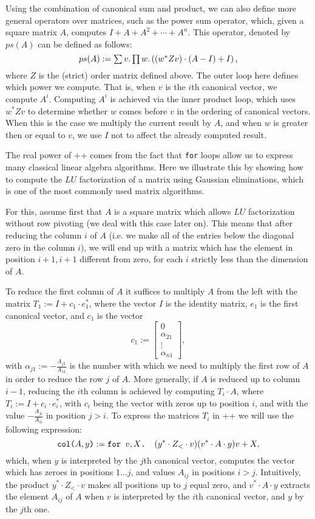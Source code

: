 Using the combination of canonical sum and product, we can also define more general operators over matrices, such as the power sum operator, which, given a square matrix $A$, computes $I + A + A^2 + \cdots + A^n$. This operator, denoted by $ps(A)$ can be defined as follows:
$$ps(A) := \textstyle\sum v.\textstyle\prod w. \left( (w^*Zv)\cdot (A-I) + I\right),$$
where $Z$ is the (strict) order matrix defined above. The outer loop here defines which power we compute. That is, when $v$ is the $i$th canonical vector, we compute $A^i$. Computing $A^i$ is achieved via the inner product loop, which uses $w^*Zv$ to determine whether $w$ comes before $v$ in the ordering of canonical vectors. When this is the case we multiply the current result by $A$, and when $w$ is greater then or equal to $v$, we use $I$ not to affect the already computed result.

\medskip

 The real power of \lang++ comes from the fact that \texttt{for} loops allow us to express many classical linear algebra algorithms. Here we illustrate this by showing how to compute the $LU$ factorization of a matrix using Gaussian eliminations, which is one of the most commonly used matrix algorithms.

For this, assume first that $A$ is a square matrix which allows $LU$ factorization without row pivoting (we deal with this case later on). This means that after reducing the column $i$ of $A$ (i.e. we make all of the entries below the diagonal zero in the column $i$), we will end up with a matrix which has the element in position $i+1,i+1$ different from zero, for each $i$ strictly less than the dimension of $A$. 

To reduce the first column of $A$ it suffices to multiply $A$ from the left with the matrix $T_1 := I + c_1\cdot e_1^*$, where the vector $I$ is the identity matrix, $e_1$ is the first canonical vector, and $c_1$ is the vector 
\[
c_1 :=
\begin{bmatrix}
    0 \\
    \alpha_{21} \\
    \vdots \\
    \alpha_{n1}
\end{bmatrix},
\]
with $\alpha_{j1} := -\frac{A_{j1}}{A_{11}}$ is the number with which we need to multiply the first row of $A$ in order to reduce the row $j$ of $A$. More generally, if $A$ is reduced up to column $i-1$, reducing the $i$th column is achieved by computing $T_i \cdot A$, where $T_i := I + c_i\cdot e_i^*$, with $c_i$ being the vector with zeros up to position $i$, and with the value $-\frac{A_{ji}}{A_{ii}}$ in position $j > i$. To express the matrices $T_i$ in \lang++ we will use the following expression:
$$\texttt{col(}A,y\texttt{)} := \texttt{for }v,X \texttt{. }(y^*\cdot Z_{<} \cdot v)(v^*\cdot A \cdot y)v + X,$$
which, when $y$ is interpreted by the $j$th canonical vector, computes the vector which has zeroes in positions $1\ldots j$, and values $A_{ij}$ in positions $i>j$. Intuitively, the product $y^*\cdot Z_{<}\cdot v$ makes all positions up to $j$ equal zero, and $v^*\cdot A\cdot y$ extracts the element $A_{ij}$ of $A$ when $v$ is interpreted by the $i$th canonical vector, and $y$ by the $j$th one.



